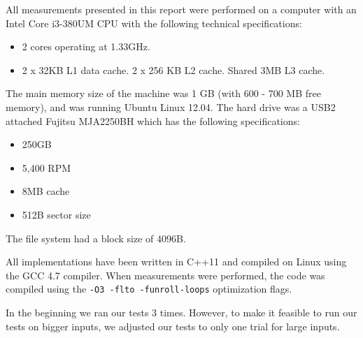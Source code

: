 All measurements presented in this report were performed on a computer
with an Intel Core i3-380UM CPU with the following technical
specifications:
\begin{itemize}
\item 2 cores operating at 1.33GHz.
\item 2 x 32KB L1 data cache. 2 x 256 KB L2 cache. Shared 3MB L3 cache.
\end{itemize}
The main memory size of the machine was 1 GB (with 600 - 700 MB free memory), and was running Ubuntu
Linux 12.04. The hard drive was a USB2 attached Fujitsu MJA2250BH which has the following specifications:

\begin{itemize}
\item 250GB
\item 5,400 RPM
\item 8MB cache
\item 512B sector size
\end{itemize}

The file system had a block size of 4096B.

All implementations have been
written in C++11 and compiled on Linux using the GCC 4.7 compiler. When measurements were performed, the
code was compiled using the \texttt{-O3 -flto -funroll-loops}
optimization flags.

In the beginning we ran our tests 3 times. However, to make it feasible
to run our tests on bigger inputs, we adjusted our tests to only
one trial for large inputs.